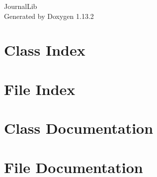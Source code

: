 \documentclass[twoside]{book}
\newcommand{\+}{\discretionary{\mbox{\scriptsize$\hookleftarrow$}}{}{}}
\newcommand{\clearemptydoublepage}{%
    \newpage{\pagestyle{empty}\cleardoublepage}%
  }
\begin{document}
  \raggedbottom
    \hypersetup{pageanchor=false,
                bookmarksnumbered=true,
                pdfencoding=unicode
               }
  \begin{titlepage}
  \vspace*{7cm}
  \begin{center}%
  {\Large Journal\+Lib}\\
  \vspace*{1cm}
  {\large Generated by Doxygen 1.13.2}\\
  \end{center}
  \end{titlepage}
  \clearemptydoublepage
  \tableofcontents
  \clearemptydoublepage
  \hypersetup{pageanchor=true}
\chapter{Class Index}

\chapter{File Index}

\chapter{Class Documentation}


\chapter{File Documentation}



  \backmatter
  \newpage
  \clearemptydoublepage
  \printindex
\end{document}
